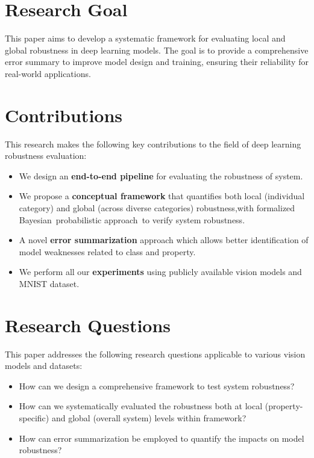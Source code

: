 \documentclass[10pt, conference, a4paper, final]{IEEEtran}
\begin{document}
\section{Research Goal}
This paper aims to develop a systematic framework for evaluating local and global robustness in deep learning models. 
The goal is to provide a comprehensive error summary to improve model design and training, ensuring their reliability for real-world applications.

\section{Contributions}
This research makes the following key contributions to the field of deep learning robustness evaluation:
\begin{itemize}
   
    \item We design an \textbf{end-to-end pipeline} for evaluating the robustness of system.
    
    \item We propose a \textbf{conceptual framework} that quantifies both local (individual category) and global (across diverse categories) robustness,with formalized Bayesian probabilistic approach to verify system robustness.
    \item A novel \textbf{error summarization}  approach which allows better identification of model weaknesses related to class and property.

    \item We perform all our \textbf{experiments} using publicly available vision models and MNIST dataset.
\end{itemize}

\section{Research Questions}

This paper addresses the following research questions applicable to various vision models and datasets:

\begin{itemize}
    \item How can we design a comprehensive framework to test system robustness?
    \item How can we systematically evaluated the robustness both at local (property-specific) and global (overall system) levels within framework?
    \item How can error summarization be employed to quantify the impacts on model robustness?
 
\end{itemize}
\end{document}
